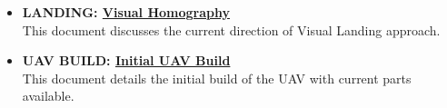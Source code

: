 \begin{itemize}
\item \textbf{LANDING: \href{https://github.com/SDSMT-CSC464-F15/landingpad/blob/master/Documents/Prototypes/Sprint_3/CV_Sprint_3.pdf}{Visual Homography}}\\
This document discusses the current direction of Visual Landing approach. 
\item \textbf{UAV BUILD: \href{https://github.com/SDSMT-CSC464-F15/landingpad/blob/master/Documents/Prototypes/Sprint_3/BuildProcedure/BuildProcess.pdf}{Initial UAV Build}} \\
This document details the initial build of the UAV with current parts available.
\end{itemize}